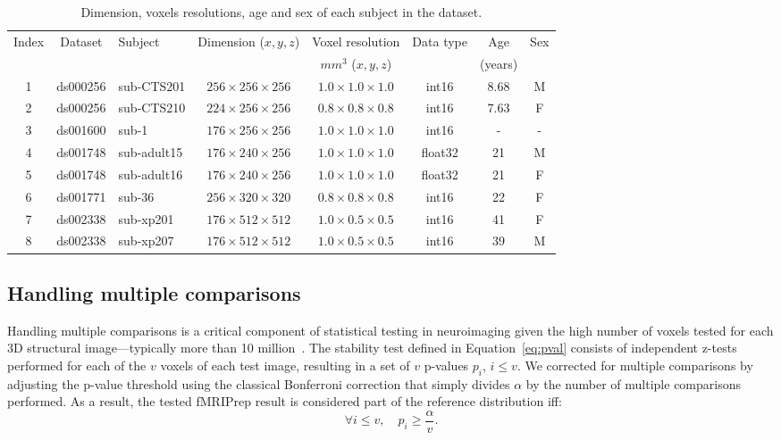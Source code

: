 \documentclass[lettersize,journal]{IEEEtran}
\newcommand{\fmriprep}{fMRIPrep\xspace}
\begin{document}
\begin{table}
  \begin{center}
    \begin{tabular}{c|c|l|c|c|c|c|c}
      Index & Dataset  & Subject     & Dimension ($x,y,z$)         & Voxel resolution            & Data type & Age     & Sex \\
            &          &             &                             & $mm^3$ ($x,y,z$)            &           & (years) &     \\
      \hline
      1     & ds000256 & sub-CTS201  & $256 \times 256 \times 256$ & $1.0 \times 1.0 \times 1.0$ & int16     & 8.68    & M   \\
      2     & ds000256 & sub-CTS210  & $224 \times 256 \times 256$ & $0.8 \times 0.8 \times 0.8$ & int16     & 7.63    & F   \\
      3     & ds001600 & sub-1       & $176 \times 256 \times 256$ & $1.0 \times 1.0 \times 1.0$ & int16     & -       & -   \\
      4     & ds001748 & sub-adult15 & $176 \times 240 \times 256$ & $1.0 \times 1.0 \times 1.0$ & float32   & 21      & M   \\
      5     & ds001748 & sub-adult16 & $176 \times 240 \times 256$ & $1.0 \times 1.0 \times 1.0$ & float32   & 21      & F   \\
      6     & ds001771 & sub-36      & $256 \times 320 \times 320$ & $0.8 \times 0.8 \times 0.8$ & int16     & 22      & F   \\
      7     & ds002338 & sub-xp201   & $176 \times 512 \times 512$ & $1.0 \times 0.5 \times 0.5$ & int16     & 41      & F   \\
      8     & ds002338 & sub-xp207   & $176 \times 512 \times 512$ & $1.0 \times 0.5 \times 0.5$ & int16     & 39      & M   \\
    \end{tabular}
  \end{center}
  \caption{Dimension, voxels resolutions, age and sex of each subject in the dataset.}
  \label{table:dataset_info}
\end{table}

\subsection{Handling multiple comparisons}

Handling multiple comparisons is a critical component of statistical testing in neuroimaging given the high number of voxels tested for each 3D structural image---typically more than 10 million~\cite{NICHOLS2007246}. The stability test defined in Equation~\ref{eq:pval} consists of independent z-tests performed for each of the $v$ voxels of each test image, resulting in a set of $v$ p-values $p_i$, $i \leq v$. We corrected for multiple comparisons by adjusting the p-value threshold using the classical Bonferroni correction that simply divides $\alpha$ by the number of multiple comparisons performed. As a result, the tested \fmriprep result is considered part of the reference distribution iff:
\begin{equation}
  \label{eq:bonferroni}
  \forall i \leq v, \quad p_i \geq \frac{\alpha}{v}.
\end{equation}
\end{document}
